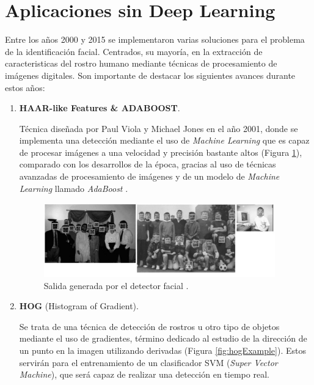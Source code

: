 \vspace{-0.7cm}
\section{Aplicaciones sin Deep Learning}
\vspace{-0.5cm}

Entre los años 2000 y 2015 se implementaron varias soluciones para el problema de la identificación facial. Centrados, su mayoría, en la extracción de caracteristicas del rostro humano mediante técnicas de procesamiento de imágenes digitales. Son importante de destacar los siguientes avances durante estos años:

\begin{enumerate}
	\item \textbf{HAAR-like Features \& ADABOOST}.
	
	Técnica diseñada por Paul Viola y Michael Jones en el año 2001, donde se implementa una detección mediante el uso de \textit{Machine Learning} que es capaz de procesar imágenes a una velocidad y precisión bastante altos (Figura \ref{fig:haarExample}), comparado con los desarrollos de la época, gracias al uso de técnicas avanzadas de procesamiento de imágenes y de un modelo de \textit{Machine Learning} llamado \textit{AdaBoost} \cite{paulViola}. 
	
	\begin{figure}[htp]
		\centering
		\includegraphics[width=10cm]{imagenes/violayjones_detector.png}
		\caption{Salida generada por el detector facial \cite{paulViola}.}
		\label{fig:haarExample}
	\end{figure}
	
	\item \textbf{HOG} (Histogram of Gradient).
	
	Se trata de una técnica de detección de rostros u otro tipo de objetos mediante el uso de gradientes, término dedicado al estudio de la dirección de un punto en la imagen utilizando derivadas (Figura \ref{fig:hogExample}). Estos servirán para el entrenamiento de un clasificador SVM (\textit{Super Vector Machine}), que será capaz de realizar una detección en tiempo real.
	

\end{enumerate}
